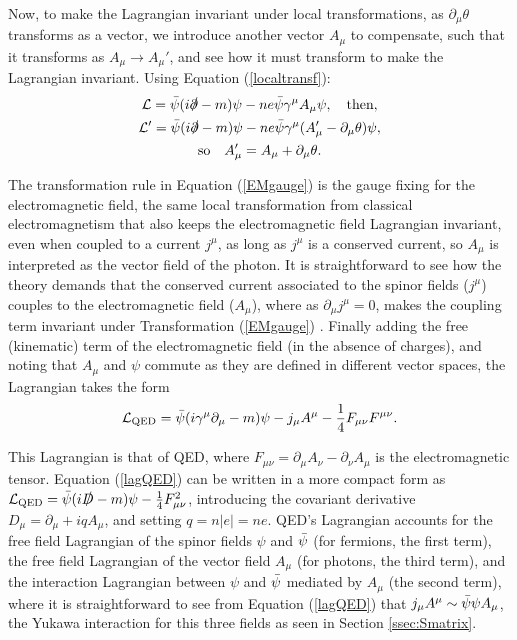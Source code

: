 Now, to make the Lagrangian invariant under local transformations, as $\partial_{\mu}\theta$ transforms as a vector, we introduce another vector $A_{\mu}$ to compensate, such that it transforms as $A_{\mu}\rightarrow A_{\mu}'$, and see how it must transform to make the Lagrangian invariant. Using Equation (\ref{localtransf}):
\begin{gather}
    \mathcal{L} = \Bar{\psi}(i\slashed{\partial} - m)\psi - ne\Bar{\psi}\gamma^{\mu}A_{\mu}\psi, \quad \textrm{then}, \nonumber \\
    \mathcal{L}' = \Bar{\psi}(i\slashed{\partial} - m)\psi - ne\Bar{\psi}\gamma^{\mu}(A_{\mu}' - \partial_{\mu}\theta)\psi, \nonumber \\
    \label{EMgauge}
    \textrm{so} \quad A_{\mu}' = A_{\mu} + \partial_{\mu}\theta.
\end{gather}

The transformation rule in Equation (\ref{EMgauge}) is the gauge fixing for the electromagnetic field, the same local transformation from classical electromagnetism that also keeps the electromagnetic field Lagrangian invariant, even when coupled to a current $j^{\mu}$, as long as $j^{\mu}$ is a conserved current, so $A_{\mu}$ is interpreted as the vector field of the photon. It is straightforward to see how the theory demands that the conserved current associated to the spinor fields ($j^{\mu}$) couples to the electromagnetic field ($A_{\mu}$), where as $\partial_{\mu}j^{\mu} = 0$, makes the coupling term invariant under Transformation (\ref{EMgauge}) \cite{Lahiri}\cite{Peskin}. Finally adding the free (kinematic) term of the electromagnetic field (in the absence of charges), and noting that $A_{\mu}$ and $\psi$ commute as they are defined in different vector spaces, the Lagrangian takes the form
\begin{equation}
\label{lagQED}
    \mathcal{L}_{\textrm{QED}} = \Bar{\psi}(i\gamma^{\mu}\partial_{\mu} - m)\psi - j_{\mu}A^{\mu} - \dfrac{1}{4}F_{\mu\nu}F^{\mu\nu}.
\end{equation}

This Lagrangian is that of QED, where $F_{\mu\nu} = \partial_{\mu}A_{\nu} - \partial_{\nu}A_{\mu}$ is the electromagnetic tensor. Equation (\ref{lagQED}) can be written in a more compact form as $\mathcal{L}_{\textrm{QED}} = \Bar{\psi}(i\slashed{D} - m)\psi - \frac{1}{4}F_{\mu\nu}^2$, introducing the covariant derivative $D_{\mu} = \partial_{\mu} + iqA_{\mu}$, and setting $q = n|e| = ne$. QED's Lagrangian accounts for the free field Lagrangian of the spinor fields $\psi$ and $\Bar{\psi}$ (for fermions, the first term), the free field Lagrangian of the vector field $A_{\mu}$ (for photons, the third term), and the interaction Lagrangian between $\psi$ and $\Bar{\psi}$ mediated by $A_{\mu}$ (the second term), where it is straightforward to see from Equation (\ref{lagQED}) that $j_{\mu}A^{\mu} \sim \Bar{\psi}\psi A_{\mu}$, the Yukawa interaction for this three fields as seen in Section \ref{ssec:Smatrix}.

